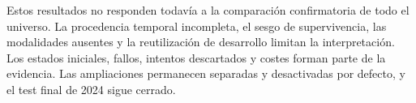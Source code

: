 \documentclass[11pt,a4paper]{report}
\begin{document}
Estos resultados no responden todavía a la comparación confirmatoria de todo
el universo. La procedencia temporal incompleta, el sesgo de supervivencia,
las modalidades ausentes y la reutilización de desarrollo limitan la
interpretación. Los estados iniciales, fallos, intentos descartados y costes
forman parte de la evidencia. Las ampliaciones permanecen separadas y
desactivadas por defecto, y el test final de 2024 sigue cerrado.

\printbibliography
\end{document}
